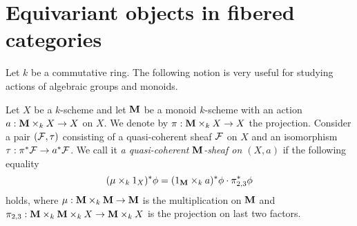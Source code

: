 \section{Equivariant objects in fibered categories}
\noindent
Let $k$ be a commutative ring. The following notion is very useful for studying actions of algebraic groups and monoids.

\begin{definition}
Let $X$ be a $k$-scheme and let $\mathbf{M}$ be a monoid $k$-scheme with an action $a:\mathbf{M}\times_kX\rightarrow X$ on $X$. We denote by $\pi:\mathbf{M}\times_kX\rightarrow X$ the projection. Consider a pair $({\mathcal F},\tau)$ consisting of a quasi-coherent sheaf ${\mathcal F}$ on $X$ and an isomorphism $\tau:\pi^*{\mathcal F} \rightarrow a^* {\mathcal F}$. We call it \textit{a quasi-coherent $\mathbf{M}$-sheaf on $(X,a)$} if the following equality
$$(\mu\times_k1_X)^*\phi = (1_{\mathbf{M}} \times_k a)^*\phi \cdot \pi_{2,3}^*\phi$$
holds, where $\mu: \mathbf{M} \times_k \mathbf{M} \rightarrow \mathbf{M}$ is the multiplication on $\mathbf{M}$ and $\pi_{2,3}:\mathbf{M}\times_k \mathbf{M} \times_k X \rightarrow \mathbf{M} \times_kX$ is the projection on last two factors.
\end{definition}

